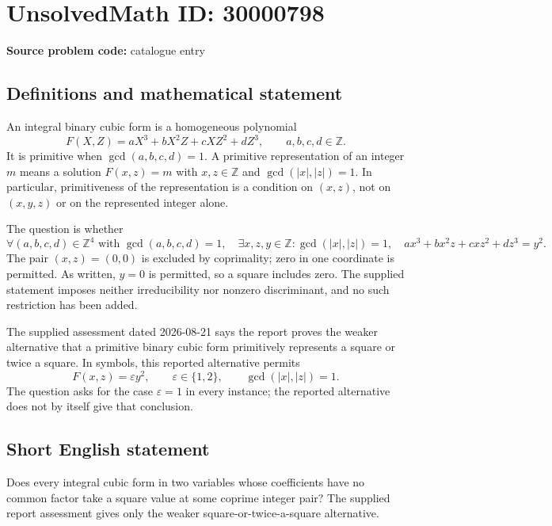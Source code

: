 \documentclass[11pt]{article}
\newcommand{\Z}{\mathbb{Z}}
\begin{document}
\section*{UnsolvedMath ID: 30000798}
\textbf{Source problem code:} catalogue entry
\subsection{Definitions and mathematical statement}
An integral binary cubic form is a homogeneous polynomial
\[
 F(X,Z)=aX^3+bX^2Z+cXZ^2+dZ^3,
 \qquad a,b,c,d\in\Z.
\]
It is primitive when \(\gcd(a,b,c,d)=1\). A primitive representation of an integer \(m\) means a solution \(F(x,z)=m\) with \(x,z\in\Z\) and \(\gcd(|x|,|z|)=1\). In particular, primitiveness of the representation is a condition on \((x,z)\), not on \((x,y,z)\) or on the represented integer alone.

The question is whether
\[
 \forall(a,b,c,d)\in\Z^4\text{ with }\gcd(a,b,c,d)=1,
 \quad\exists x,z,y\in\Z:
 \gcd(|x|,|z|)=1,
 \quad ax^3+bx^2z+cxz^2+dz^3=y^2.
\]
The pair \((x,z)=(0,0)\) is excluded by coprimality; zero in one coordinate is permitted. As written, \(y=0\) is permitted, so a square includes zero. The supplied statement imposes neither irreducibility nor nonzero discriminant, and no such restriction has been added.

The supplied assessment dated 2026-08-21 says the report proves the weaker alternative that a primitive binary cubic form primitively represents a square or twice a square. In symbols, this reported alternative permits
\[
 F(x,z)=\varepsilon y^2,\qquad \varepsilon\in\{1,2\},\qquad \gcd(|x|,|z|)=1.
\]
The question asks for the case \(\varepsilon=1\) in every instance; the reported alternative does not by itself give that conclusion.
\subsection{Short English statement}
Does every integral cubic form in two variables whose coefficients have no common factor take a square value at some coprime integer pair? The supplied report assessment gives only the weaker square-or-twice-a-square alternative.
\end{document}

